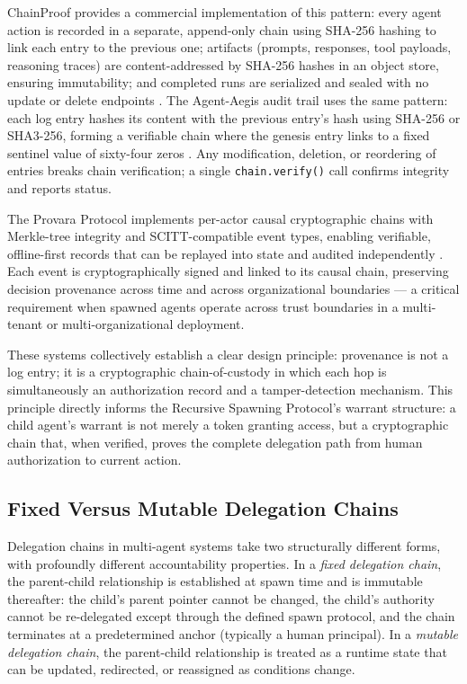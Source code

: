 ChainProof provides a commercial implementation of this pattern: every agent action is recorded in a separate, append-only chain using SHA-256 hashing to link each entry to the previous one; artifacts (prompts, responses, tool payloads, reasoning traces) are content-addressed by SHA-256 hashes in an object store, ensuring immutability; and completed runs are serialized and sealed with no update or delete endpoints \cite{chainproof2025}. The Agent-Aegis audit trail uses the same pattern: each log entry hashes its content with the previous entry's hash using SHA-256 or SHA3-256, forming a verifiable chain where the genesis entry links to a fixed sentinel value of sixty-four zeros \cite{agent-aegis2025}. Any modification, deletion, or reordering of entries breaks chain verification; a single \texttt{chain.verify()} call confirms integrity and reports status.

The Provara Protocol implements per-actor causal cryptographic chains with Merkle-tree integrity and SCITT-compatible event types, enabling verifiable, offline-first records that can be replayed into state and audited independently \cite{provara2025}. Each event is cryptographically signed and linked to its causal chain, preserving decision provenance across time and across organizational boundaries — a critical requirement when spawned agents operate across trust boundaries in a multi-tenant or multi-organizational deployment.

These systems collectively establish a clear design principle: provenance is not a log entry; it is a cryptographic chain-of-custody in which each hop is simultaneously an authorization record and a tamper-detection mechanism. This principle directly informs the Recursive Spawning Protocol's warrant structure: a child agent's warrant is not merely a token granting access, but a cryptographic chain that, when verified, proves the complete delegation path from human authorization to current action.

\subsection{Fixed Versus Mutable Delegation Chains}

Delegation chains in multi-agent systems take two structurally different forms, with profoundly different accountability properties. In a \emph{fixed delegation chain}, the parent-child relationship is established at spawn time and is immutable thereafter: the child's parent pointer cannot be changed, the child's authority cannot be re-delegated except through the defined spawn protocol, and the chain terminates at a predetermined anchor (typically a human principal). In a \emph{mutable delegation chain}, the parent-child relationship is treated as a runtime state that can be updated, redirected, or reassigned as conditions change.

